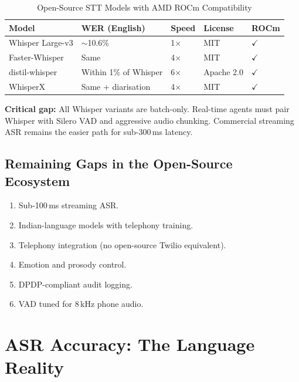 \documentclass[12pt,a4paper]{article}
\begin{document}
\begin{table}[H]\centering
\caption{Open-Source STT Models with AMD ROCm Compatibility}
\label{tab:oss-stt}
\begin{tabularx}{\textwidth}{lllll}
\toprule
\textbf{Model} & \textbf{WER (English)} & \textbf{Speed} & \textbf{License} & \textbf{ROCm} \\
\midrule
Whisper Large-v3 & $\sim$10.6\%          & 1$\times$ & MIT        & $\checkmark$ \\
Faster-Whisper   & Same                  & 4$\times$ & MIT        & $\checkmark$ \\
distil-whisper   & Within 1\% of Whisper & 6$\times$ & Apache 2.0 & $\checkmark$ \\
WhisperX         & Same + diarisation    & 4$\times$ & MIT        & $\checkmark$ \\
\bottomrule
\end{tabularx}
\end{table}

\noindent\textbf{Critical gap:} All Whisper variants are batch-only.  Real-time
agents must pair Whisper with Silero VAD and aggressive audio chunking.
Commercial streaming ASR remains the easier path for sub-300\,ms latency.

\subsection{Remaining Gaps in the Open-Source Ecosystem}

\begin{enumerate}[noitemsep]
  \item Sub-100\,ms streaming ASR.
  \item Indian-language models with telephony training.
  \item Telephony integration (no open-source Twilio equivalent).
  \item Emotion and prosody control.
  \item DPDP-compliant audit logging.
  \item VAD tuned for 8\,kHz phone audio.
\end{enumerate}

\section{ASR Accuracy: The Language Reality}
\label{sec:asr-accuracy}
\end{document}
